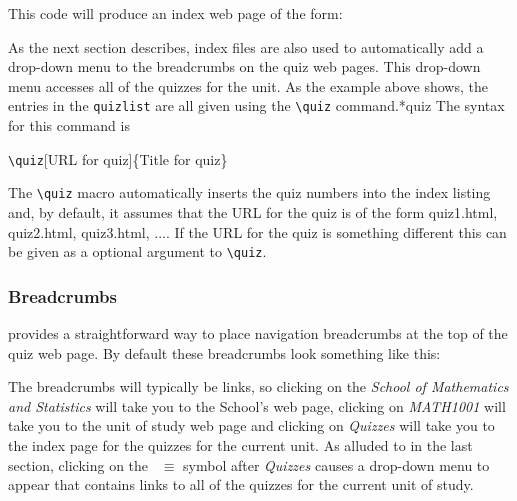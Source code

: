 \documentclass[svgnames]{article}
\begin{document}
  

  This code will produce an index web page of the form:


  As the next section describes, index files are also used to
  automatically add a drop-down menu to the breadcrumbs on the quiz web
  pages. This drop-down menu accesses all of the quizzes for the unit.
  As the example above shows, the entries in the \Verb|quizlist| are all
  given using the \Verb|\quiz| command.*{quiz} The syntax for this command is

  \begin{center}
      \Verb|\quiz|[URL for quiz]\{Title for quiz\}
  \end{center}

  \noindent
  The \Verb|\quiz| macro automatically inserts the quiz numbers
  into the index listing and, by default, it assumes that the URL for the quiz
  is of the form \textsf{quiz1.html}, \textsf{quiz2.html},
  \textsf{quiz3.html}, .... If the URL for the quiz is something
  different this can be given as a optional argument to \Verb|\quiz|.

  \subsubsection{Breadcrumbs}\label{SS:breadcrumbs}

  \WebQuiz provides a straightforward way to place navigation breadcrumbs
  at the top of the quiz web page. By default these
  breadcrumbs look something like this:


  \noindent
  The breadcrumbs will typically be links, so clicking on the
  \textit{School of Mathematics and Statistics} will take you to the
  School's web page, clicking on \textit{MATH1001} will take you to the
  unit of study web page and clicking on \textit{Quizzes} will take you
  to the index page for the quizzes for the current unit. As alluded to
  in the last section, clicking on the~{\large\color{red} $\equiv$} symbol after
  \textit{Quizzes} causes a drop-down menu to appear that
  contains links to all of the quizzes for the current unit of study.

\end{document}
